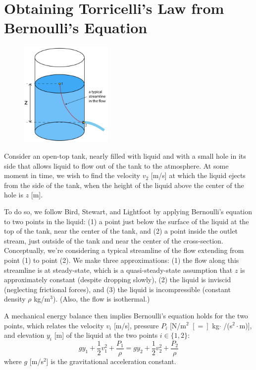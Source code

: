 \documentclass[a4paper,fleqn]{cas-sc}
\begin{document}
\section{Obtaining Torricelli's Law from Bernoulli's Equation}

\begin{figure}
	\centering
	\includegraphics[width=0.4\textwidth]{../drawings_and_photo/torricelli_illustration.pdf}
\end{figure}

	Consider an open-top tank, nearly filled with liquid and with a small hole in its side that allows liquid to flow out of the tank to the atmosphere. 
	At some moment in time, we wish to find the velocity $v_2$ [m/s] at which the liquid ejects from the side of the tank, when the height of the liquid above the center of the hole is $z$ [m].
	
	To do so, we follow Bird, Stewart, and Lightfoot \cite{bsl_book} by applying Bernoulli's equation to two points in the liquid: 
	(1) a point just below the surface of the liquid at the top of the tank, near the center of the tank, and 
	(2) a point inside the outlet stream, just outside of the tank and near the center of the cross-section. 
	 Conceptually, we're considering a typical streamline of the flow extending from point (1) to point (2).
	We make three approximations: 
	(1) the flow along this streamline is at steady-state, which is a quasi-steady-state assumption that $z$ is approximately constant (despite dropping slowly),
	(2) the liquid is inviscid (neglecting frictional forces),
	and
	(3) the liquid is incompressible (constant density $\rho$ kg/m$^3$).
	(Also, the flow is isothermal.)
	
	A mechanical energy balance then implies Bernoulli's equation holds for the two points, which relates the velocity $v_i$ [m/s], pressure $P_i$ [N/m$^2$ $[=]$ kg$\cdot$ /(s$^2\cdot$m)], and elevation $y_i$ [m] of the liquid at the two points $i\in\{1,2\}$:
	\begin{equation}
	g y_1 + \frac{1}{2} v_1^2 + \frac{P_1}{\rho} = gy_2 + \frac{1}{2} v_2^2 + \frac{P_2}{\rho} 
	\end{equation}
	where $g$ [m/s$^2$] is the gravitational acceleration constant. 
	
\end{document}
